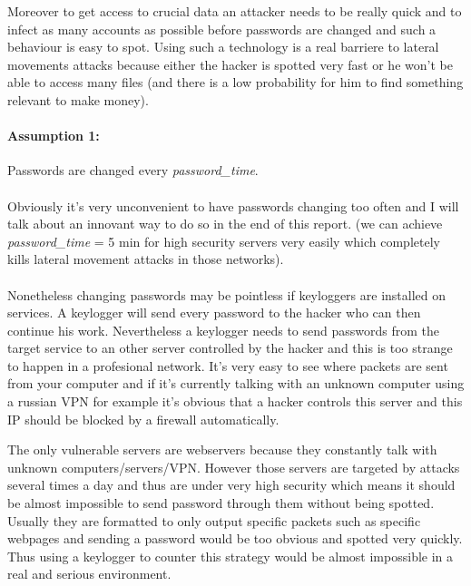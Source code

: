 \documentclass[11pt]{article}
\begin{document}
Moreover to get access to crucial data an attacker needs to be really quick and to infect as many accounts as possible before passwords are changed and such a behaviour is easy to spot. Using such a technology is a real barriere to lateral movements attacks because either the hacker is spotted very fast or he won't be able to access many files (and there is a low probability for him to find something relevant to make money).
\paragraph{Assumption 1:}
Passwords are changed every \textit{password\_time}.
\paragraph{}
Obviously it's very unconvenient to have passwords changing too often and I will talk about an innovant way to do so in the end of this report. (we can achieve \textit{password\_time} = 5 min for high security servers very easily which completely kills lateral movement attacks in those networks).\\
\paragraph{}
Nonetheless changing passwords may be pointless if keyloggers are installed on services. A keylogger will send every password to the hacker who can then continue his work. Nevertheless a keylogger needs to send passwords from the target service to an other server controlled by the hacker and this is too strange to happen in a profesional network. It's very easy to see where packets are sent from your computer and if it's currently talking with an unknown computer using a russian VPN for example it's obvious that a hacker controls this server and this IP should be blocked by a firewall automatically. 

The only vulnerable servers are webservers because they constantly talk with unknown computers/servers/VPN. However those servers are targeted by attacks several times a day and thus are under very high security which means it should be almost impossible to send password through them without being spotted. Usually they are formatted to only output specific packets such as specific webpages and sending a password would be too obvious and spotted very quickly. Thus using a keylogger to counter this strategy would be almost impossible in a real and serious environment.
\end{document}
